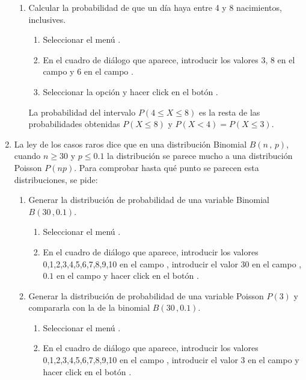 \begin{enumerate}[leftmargin=*]
\begin{enumerate}
\item Calcular la probabilidad de que un día haya entre 4 y 8 nacimientos, inclusives.
\begin{indicacion}
\begin{enumerate}
\item Seleccionar el menú .
\item En el cuadro de diálogo que aparece, introducir los valores 3, 8 en el campo  y
6 en el campo .
\item Seleccionar la opción  y hacer click en el botón .
\end{enumerate}
La probabilidad del intervalo $P(4\leq X\leq 8)$ es la resta de las probabilidades obtenidas $P(X\leq 8)$ y $P(X<4)=P(X\leq 3)$.
\end{indicacion}
\end{enumerate}


\item La ley de los casos raros dice que en una distribución Binomial $B(n\,,\,p)$, cuando $n\geq 30$ y $p\leq
0.1$ la distribución se parece mucho a una distribución Poisson $P(np)$. 
Para comprobar hasta qué punto se parecen esta distribuciones, se pide:
\begin{enumerate}
\item Generar la distribución de probabilidad de una variable Binomial $B(30\,,0.1)$.
\begin{indicacion}
\begin{enumerate}
\item Seleccionar el menú .
\item En el cuadro de diálogo que aparece, introducir los valores 0,1,2,3,4,5,6,7,8,9,10 en el campo , introducir el valor 30 en el campo , $0.1$ en el campo  y hacer click en el botón .
\end{enumerate}
\end{indicacion}

\item Generar la distribución de probabilidad de una variable Poisson $P(3)$ y compararla con la de la binomial
$B(30\,,0.1)$.
\begin{indicacion}
\begin{enumerate}
\item Seleccionar el menú .
\item En el cuadro de diálogo que aparece, introducir los valores 0,1,2,3,4,5,6,7,8,9,10 en el campo , introducir el valor 3 en el campo  y hacer click en el botón .
\end{enumerate}
\end{indicacion}


\end{enumerate}
\end{enumerate}
